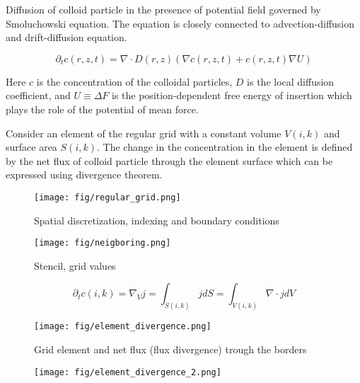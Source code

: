 \documentclass[12pt, a4paper]{article}
\begin{document}
Diffusion of colloid particle in the presence of potential field governed by Smoluchowski equation. The equation is closely connected to advection-diffusion and drift-diffusion equation.

\begin{equation}
    \partial_{t} c(r,z,t) = \nabla \cdot D(r,z)(\nabla c(r, z, t) +  c(r, z, t) \nabla U)
\end{equation}

Here $c$ is the concentration of the colloidal particles, $D$ is the local diffusion coefficient, and $U \equiv \Delta F$ is the position-dependent free energy of insertion which plays the role of the potential of mean force.


Consider an element of the regular grid with a constant volume $V(i,k)$ and surface area $S(i,k)$.
The change in the concentration in the element is defined by the net flux of colloid particle through the element surface which can be expressed using divergence theorem.

\begin{figure}
    \centering
    \texttt{[image: fig/regular\_grid.png]}
    \caption{Spatial discretization, indexing and boundary conditions}
\end{figure}

\begin{figure}
    \centering
    \texttt{[image: fig/neigboring.png]}
    \caption{Stencil, grid values}
\end{figure}

\begin{equation}
    \partial_{t}c(i,k) = \nabla_{V} j = \int_{S(i,k)} j dS = \int_{V(i,k)} \nabla \cdot j dV
\end{equation}


\begin{figure}
    \centering
    \texttt{[image: fig/element\_divergence.png]}
    \caption{Grid element and net flux (flux divergence) trough the borders}
\end{figure}

\begin{figure}
    \centering
    \texttt{[image: fig/element\_divergence\_2.png]}
\end{figure}
\end{document}
